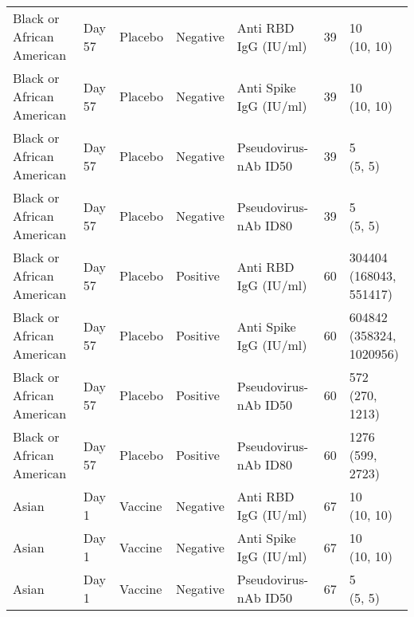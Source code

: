\documentclass[]{book}
\theoremstyle{definition}
\theoremstyle{definition}
\theoremstyle{definition}
\newcommand{\1}{\mathbbm{1}}
\begin{document}
\begin{landscape}
\begin{ThreePartTable}
\begin{longtable}[t]{>{\raggedright\arraybackslash}p{7cm}llllll}
\hspace{1em}Black or African American & Day 57 & Placebo & Negative & Anti RBD IgG (IU/ml) & 39 & \makecell[l]{10\\(10, 10)}\\
\hspace{1em}Black or African American & Day 57 & Placebo & Negative & Anti Spike IgG (IU/ml) & 39 & \makecell[l]{10\\(10, 10)}\\
\hspace{1em}Black or African American & Day 57 & Placebo & Negative & Pseudovirus-nAb ID50 & 39 & \makecell[l]{5\\(5, 5)}\\
\hspace{1em}Black or African American & Day 57 & Placebo & Negative & Pseudovirus-nAb ID80 & 39 & \makecell[l]{5\\(5, 5)}\\
\hspace{1em}Black or African American & Day 57 & Placebo & Positive & Anti RBD IgG (IU/ml) & 60 & \makecell[l]{304404\\(168043, 551417)}\\
\hspace{1em}Black or African American & Day 57 & Placebo & Positive & Anti Spike IgG (IU/ml) & 60 & \makecell[l]{604842\\(358324, 1020956)}\\
\hspace{1em}Black or African American & Day 57 & Placebo & Positive & Pseudovirus-nAb ID50 & 60 & \makecell[l]{572\\(270, 1213)}\\
\hspace{1em}Black or African American & Day 57 & Placebo & Positive & Pseudovirus-nAb ID80 & 60 & \makecell[l]{1276\\(599, 2723)}\\
\hspace{1em}Asian & Day 1 & Vaccine & Negative & Anti RBD IgG (IU/ml) & 67 & \makecell[l]{10\\(10, 10)}\\
\hspace{1em}Asian & Day 1 & Vaccine & Negative & Anti Spike IgG (IU/ml) & 67 & \makecell[l]{10\\(10, 10)}\\
\hspace{1em}Asian & Day 1 & Vaccine & Negative & Pseudovirus-nAb ID50 & 67 & \makecell[l]{5\\(5, 5)}\\

\end{longtable}
\end{ThreePartTable}
\end{landscape}
\end{document}
